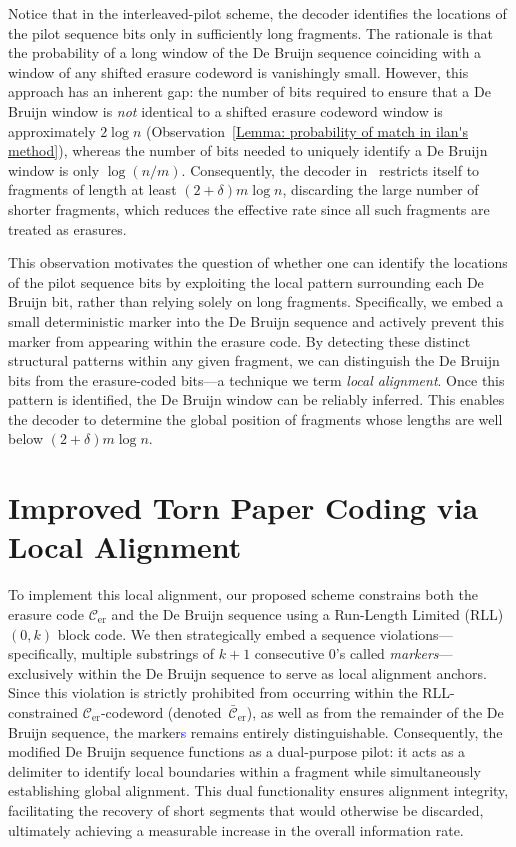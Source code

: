\documentclass[journal,letterpaper,onecolumn,11pt]{IEEEtran}
\newcommand{\cC}{\mathcal{C}}
\newcommand{\blue}[1]{\textcolor{blue}{#1}}
\begin{document}
Notice that in the interleaved-pilot scheme, the decoder identifies the locations of the pilot sequence bits only in sufficiently long fragments. 
The rationale is that the probability of a long window of the De Bruijn sequence coinciding with a window of any shifted erasure codeword is vanishingly small. 
However, this approach has an inherent gap: the number of bits required to ensure that a De Bruijn window is \emph{not} identical to a shifted erasure codeword window is approximately  $2\log n$ (Observation~\ref{Lemma: probability of match in ilan's method}), whereas the number of bits needed to uniquely identify a De Bruijn window is only $\log (n/m)$. 
Consequently, the decoder in~\cite{shomorony2021torn} restricts itself to fragments of length at least $(2+\delta)m\log n$, discarding the large number of shorter fragments, which reduces the effective rate since all such fragments are treated as erasures.

This observation motivates the question of whether one can identify the locations of the pilot sequence bits by exploiting the local pattern surrounding each De Bruijn bit, rather than relying solely on long fragments. 
Specifically, we embed a small deterministic marker into the De Bruijn sequence and actively prevent this marker from appearing within the erasure code. 
By detecting these distinct structural patterns within any given fragment, we can distinguish the De Bruijn bits from the erasure-coded bits—a technique we term \textit{local alignment}. 
Once this pattern is identified, the De Bruijn window can be reliably inferred. 
This enables the decoder to determine the global position of fragments whose lengths are well below $(2+\delta)m\log n$.

\section{Improved Torn Paper Coding via Local Alignment}\label{Section:propsed work}
To implement this local alignment, our proposed scheme constrains both the erasure code $\cC_{\mathrm{er}}$ and the De Bruijn sequence using a Run-Length Limited (RLL) $(0, k)$ block code. We then strategically embed a sequence violations---specifically, multiple substrings of $k+1$ consecutive $0$'s called \textit{markers}---exclusively within the De Bruijn sequence to serve as  local alignment anchors. 
Since this violation is strictly prohibited from occurring within the RLL-constrained $\cC_{\mathrm{er}}$-codeword (denoted~$\bar{\cC}_{\mathrm{er}}$), as well as from the remainder of the De Bruijn sequence, the marker\blue{s} remains entirely distinguishable. 
Consequently, the modified De Bruijn sequence functions as a dual-purpose pilot: it acts as a delimiter to identify local boundaries within a fragment while simultaneously establishing global alignment. 
This dual functionality ensures alignment integrity, facilitating the recovery of short segments that would otherwise be discarded, ultimately achieving a measurable increase in the overall information rate.
\end{document}
